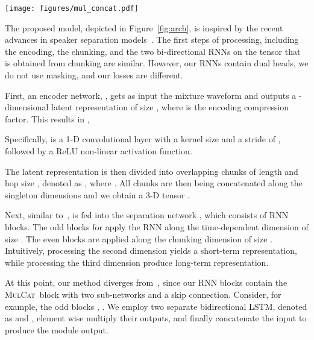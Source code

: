 \documentclass{article}
\newcommand{\ours}{\textsc{MulCat}~}
\begin{document}
\begin{figure*}[t]
   \centering
    \texttt{[image: figures/mul\_concat.pdf]}
    \caption{The multiply and concat (\ours) block. In the odd blocks, the 3D tensor obtained from chunking is fed into two different bi-directional LSTMs that operate along the second dimension. The results are multiplied element-wise, followed by a concatenation of the original signal along the third dimension. A learned linear projection along this dimension is then applied to obtain a tensor of the same size of the input. In the even blocks, the same set of operations occur along the chunking axis.}
 \label{fig:multcat}
\end{figure*}


The proposed model, depicted in Figure~\ref{fig:arch}, is inspired by the recent advances in speaker separation models~\cite{luo2018tasnet, luo2019conv}. The first steps of processing, including the encoding, the chunking, and the two bi-directional RNNs on the tensor that is obtained from chunking are similar. However, our RNNs contain dual heads, we do not use masking, and our losses are different.

First, an encoder network, , gets as input the mixture waveform  and outputs a -dimensional latent representation  {of size , where  is the encoding compression factor. This results in },

Specifically,  is a 1-D convolutional layer with a kernel size  and a stride of , followed by a ReLU non-linear activation function. 

The latent representation  is then divided into {} overlapping chunks of length  and hop size , denoted as , where . All chunks are then being concatenated along the singleton dimensions and we obtain a 3-D tensor . 

Next, similar to~\cite{luo2019dual},  is fed into the separation network , which consists of  RNN blocks. The odd blocks  for  apply the RNN along the time-dependent dimension of size . The even  blocks are applied along the chunking dimension of size . Intuitively, processing the second dimension yields a short-term representation, while processing the third dimension produce long-term representation.

At this point, our method diverges from~\cite{luo2019dual}, since our RNN blocks contain the \ours block with two sub-networks and a skip connection. Consider, for example, the odd blocks , . We employ two separate bidirectional LSTM, denoted as  and , element wise multiply their outputs, and finally concatenate the input to produce the module output. 
\end{document}
